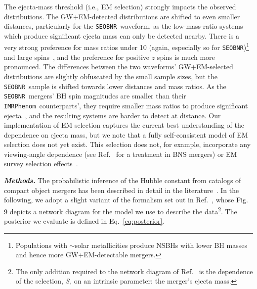 \documentclass[%
 reprint,
 superscriptaddress,
 nofootinbib,
 amsmath,amssymb,
 aps,
]{revtex4-2}
\newcommand{\seobnr}{\texttt{SEOBNR}}
\newcommand{\imrp}{\texttt{IMRPhenom}}
\begin{document}
The ejecta-mass threshold (i.e., EM selection) strongly impacts the observed distributions. The GW+EM-detected distributions are shifted to even smaller distances, particularly for the \seobnr\ waveform, as the low-mass-ratio systems which produce significant ejecta mass can only be detected nearby. There is a very strong preference for mass ratios under 10 (again, especially so for \seobnr)\footnote{Populations with $\sim$solar metallicities produce NSBHs with lower BH masses~\cite{Kruckow_etal:2018} and hence more GW+EM-detectable mergers.} and large spins~\cite{Foucart:2012,Foucart_etal:2018}, and the preference for positive $z$ spins is much more pronounced. The differences between the two waveforms' GW+EM-selected distributions are slightly obfuscated by the small sample sizes, but the \seobnr\ sample is shifted towards lower distances and mass ratios. As the \seobnr\ mergers' BH spin magnitudes are smaller than their \imrp\ counterparts', they require smaller mass ratios to produce significant ejecta~\cite{Foucart_etal:2018}, and the resulting systems are harder to detect at distance. Our implementation of EM selection captures the current best understanding of the dependence on ejecta mass, but we note that a fully self-consistent model of EM selection does not yet exist. This selection does not, for example, incorporate any viewing-angle dependence (see Ref.~\cite{Chen:2020} for a treatment in BNS mergers) or EM survey selection effects~\cite[e.g.,][]{Rosswog_etal:2017,Scolnic_etal:2018,Cowperthwaite_etal:2019,Setzer_etal:2019}.


\textbf{\emph{Methods.}} The probabilistic inference of the Hubble constant from catalogs of compact object mergers has been described in detail in the literature~\cite{Schutz:1986,Dalal:2006,Nissanke_etal:2010,Taylor_etal:2012,Nissanke_etal:2013,Abbott_etal:2017a,Chen_etal:2018,Fishbach_etal:2018,Feeney_etal:2018,Mandel_etal:2018,Gray_etal:2019,Mortlock_etal:2019,Vitale_etal:2020}. In the following, we adopt a slight variant of the formalism set out in Ref.~\cite{Mortlock_etal:2019}, whose Fig. 9 depicts a network diagram for the model we use to describe the data\footnote{The only addition required to the network diagram of Ref.~\cite{Mortlock_etal:2019} is the dependence of the selection, $S$, on an intrinsic parameter: the merger's ejecta mass.}. The posterior we evaluate is defined in Eq.~\ref{eq:posterior}.
\end{document}
